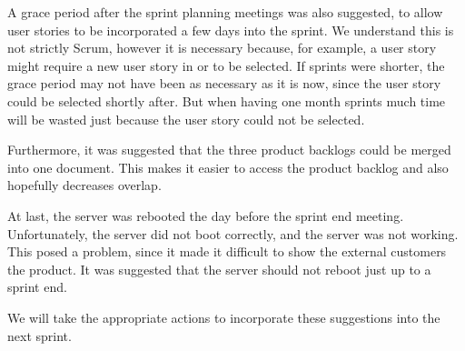 A grace period after the sprint planning meetings was also suggested, to allow user stories to be incorporated a few days into the sprint. We understand this is not strictly Scrum, however it is necessary because, for example, a \db user story might require a new user story in \gui or \bd to be selected. If sprints were shorter, the grace period may not have been as necessary as it is now, since the user story could be selected shortly after. But when having one month sprints much time will be wasted just because the user story could not be selected.

Furthermore, it was suggested that the three product backlogs could be merged into one document. This makes it easier to access the product backlog and also hopefully decreases overlap.

At last, the server was rebooted the day before the \gui sprint end meeting. Unfortunately, the server did not boot correctly, and the server was not working. This posed a problem, since it made it difficult to show the external customers the product. It was suggested that the server should not reboot just up to a sprint end.

We will take the appropriate actions to incorporate these suggestions into the next sprint.